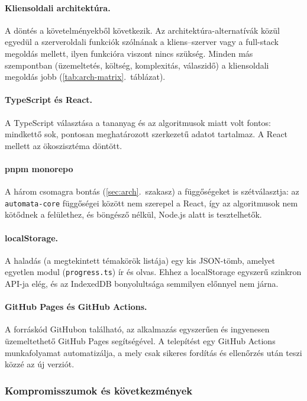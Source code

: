 \paragraph{Kliensoldali architektúra.}
A döntés a követelményekből következik. Az
architektúra-alternatívák közül egyedül a szerveroldali funkciók
szólnának a kliens--szerver vagy a full-stack megoldás mellett,
ilyen funkcióra viszont nincs szükség. Minden más szempontban
(üzemeltetés, költség, komplexitás, válaszidő) a kliensoldali
megoldás jobb (\ref{tab:arch-matrix}.~táblázat).

\paragraph{TypeScript és React.}
A TypeScript választása a tananyag és az algoritmusok miatt volt
fontos: mindkettő sok, pontosan meghatározott szerkezetű adatot
tartalmaz. A
React mellett az ökoszisztéma döntött. 

\paragraph{pnpm monorepo}
A három csomagra bontás (\ref{sec:arch}.~szakasz) a függőségeket is
szétválasztja: az \texttt{automata-core} függőségei között nem
szerepel a React, így az algoritmusok nem kötődnek a felülethez, és
böngésző nélkül, Node.js alatt is tesztelhetők.

\paragraph{localStorage.}
A haladás (a megtekintett témakörök listája) egy kis JSON-tömb,
amelyet egyetlen modul (\texttt{progress.ts}) ír és olvas. Ehhez a
localStorage egyszerű szinkron API-ja elég, és az IndexedDB
bonyolultsága semmilyen előnnyel nem járna.

\paragraph{GitHub Pages és GitHub Actions.} 
A forráskód GitHubon található, 
az alkalmazás egyszerűen és ingyenesen üzemeltethető GitHub Pages segítségével.
 A telepítést egy GitHub Actions munkafolyamat automatizálja, a
 mely csak sikeres fordítás és ellenőrzés után teszi közzé az új verziót.

\subsubsection{Kompromisszumok és következmények}

